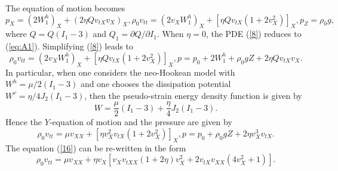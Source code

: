 \documentclass[11pt,letter,subeqn,fleqn]{article}
\numberwithin{equation}{section}
\numberwithin{table}{section}
\numberwithin{figure}{section}
\begin{document}
The equation of motion becomes
\begin{subequations}\label{8}
	\begin{equation}\label{9}
	p_{X}=\left(2W^{h}_{1}\right)_{X}+\left(2\eta Qv_{tX}v_{X}\right)_{X},
	\end{equation}
	\begin{equation}\label{10}
	\rho_{0}v_{tt}=\left(2v_{X}W^{h}_{1}\right)_{X}+\left[\eta Qv_{tX}\left(1+2v^{2}_{X}\right)\right]_{X},
	\end{equation}
	\begin{equation}\label{11}
	p_{Z}=\rho_{0}g,
	\end{equation}
\end{subequations}
where $Q=Q(I_{1}-3)$ and $Q_{1}=\partial Q/\partial I_{1}$. When $\eta=0$, the PDE (\ref{8}) reduces to (\ref{eq:A1}).
Simplifying (\ref{8}) leads to
\begin{subequations}\label{12}
	\begin{equation}\label{13}
	\rho_{0}v_{tt}=\left(2v_{X}W^{h}_{1}\right)_{X}+\left[\eta Qv_{tX}\left(1+2v^{2}_{X}\right)\right]_{X},
	\end{equation}
	\begin{equation}\label{14}
	p=p_{0}+2W^{h}_{1}+\rho_{0}gZ+2\eta Qv_{tX}v_{X}.
	\end{equation}
\end{subequations}
In particular, when one considers the neo-Hookean model with $W^{h}=\mu/2(I_{1}-3)$ and one chooses the dissipation potential $\displaystyle W^{v}={\eta}/{4} J_{2}(I_{1}-3)$, then the pseudo-strain energy density function is given by
\begin{equation}\label{15}
W=\frac{\mu}{2}(I_{1}-3)+\frac{\eta}{4} J_{2}(I_{1}-3).
\end{equation}
Hence the $Y$-equation of motion and the pressure are given by
\begin{subequations}\label{16a}
	\begin{equation}\label{16}
	\rho_{0}v_{tt}=\mu v_{XX}+\left[\eta v^{2}_{X}v_{tX}\left(1+2v^{2}_{X}\right)\right]_{X},
	\end{equation}
	\begin{equation}\label{17}
	p=p_{0}+\rho_{0}gZ+2\eta v^{3}_{X}v_{tX}.
	\end{equation}
\end{subequations}
The equation (\ref{16}) can be re-written in the form
\begin{equation}\label{16r}
\rho_{0}v_{tt}=\mu v_{XX}+\eta v_{X} \left[v_{X}v_{tXX}\left(1+2\eta\right) v^{2}_{X}+2v_{tX}v_{XX}\left(4v^{2}_{X}+1\right)\right].
\end{equation}
\end{document}
